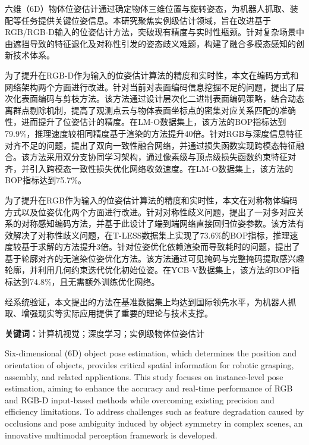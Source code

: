 \cleardoublepage
{}
\par 六维（6D）物体位姿估计通过确定物体三维位置与旋转姿态，为机器人抓取、装配等任务提供关键位姿信息。本研究聚焦实例级估计领域，旨在改进基于RGB/RGB-D输入的位姿估计方法，突破现有精度与实时性瓶颈。针对复杂场景中由遮挡导致的特征退化及对称性引发的姿态歧义难题，构建了融合多模态感知的创新技术体系。
\par 为了提升在RGB-D作为输入的位姿估计算法的精度和实时性，本文在编码方式和网络架构两个方面进行改进。针对当前对表面编码信息挖掘不足的问题，提出了层次化表面编码与剪枝方法。该方法通过设计层次化二进制表面编码策略，结合动态离群点剔除机制，提高了观测点云与物体表面坐标点的密集对应关系匹配的准确性，进而提升了位姿估计的精度。在LM-O数据集上，该方法的BOP指标达到79.9\%，推理速度较相同精度基于渲染的方法提升40倍。针对RGB与深度信息特征对齐不足的问题，提出了双向一致性融合网络，并通过损失函数实现跨模态特征融合。该方法采用双分支协同学习架构，通过像素级与顶点级损失函数约束特征对齐，并引入跨模态一致性损失优化网络收敛速度。在LM-O数据集上，该方法的BOP指标达到75.7\%。
\par 为了提升在RGB作为输入的位姿估计算法的精度和实时性，本文在对称物体编码方式以及位姿优化两个方面进行改进。针对对称性歧义问题，提出了一对多对应关系的对称感知编码方法，并基于此设计了端到端网络直接回归位姿参数。该方法有效解决了对称性歧义问题，在T-LESS数据集上实现了73.6\%的BOP指标，推理速度较基于求解的方法提升3倍。针对位姿优化依赖渲染而导致耗时的问题，提出了基于轮廓对齐的无渲染位姿优化方法。该方法通过可见掩码与完整掩码提取感兴趣轮廓，并利用几何约束迭代优化初始位姿。在YCB-V数据集上，该方法的BOP指标达到74.8\%，且无需额外训练优化网络。
\par 经系统验证，本文提出的方法在基准数据集上均达到国际领先水平，为机器人抓取、增强现实等实际应用提供了重要的理论与技术支撑。
\par \textbf{关键词：}计算机视觉；深度学习；实例级物体位姿估计
\cleardoublepage
{}
\par Six-dimensional (6D) object pose estimation, which determines the position and orientation of objects, provides critical spatial information for robotic grasping, assembly, and related applications. This study focuses on instance-level pose estimation, aiming to enhance the accuracy and real-time performance of RGB and RGB-D input-based methods while overcoming existing precision and efficiency limitations. To address challenges such as feature degradation caused by occlusions and pose ambiguity induced by object symmetry in complex scenes, an innovative multimodal perception framework is developed.

